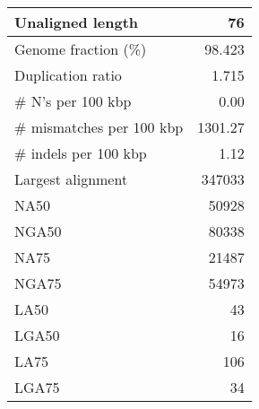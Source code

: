 \documentclass[12pt,a4paper]{article}
\begin{document}
\begin{table}[ht]
\begin{center}
\begin{tabular}{|l*{1}{|r}|}
Unaligned length & 76 \\ \hline
Genome fraction (\%) & 98.423 \\ \hline
Duplication ratio & 1.715 \\ \hline
\# N's per 100 kbp & 0.00 \\ \hline
\# mismatches per 100 kbp & 1301.27 \\ \hline
\# indels per 100 kbp & 1.12 \\ \hline
Largest alignment & 347033 \\ \hline
NA50 & 50928 \\ \hline
NGA50 & 80338 \\ \hline
NA75 & 21487 \\ \hline
NGA75 & 54973 \\ \hline
LA50 & 43 \\ \hline
LGA50 & 16 \\ \hline
LA75 & 106 \\ \hline
LGA75 & 34 \\ \hline
\end{tabular}
\end{center}
\end{table}
\end{document}
